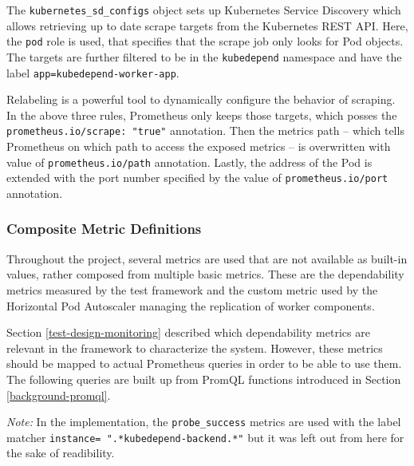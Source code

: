 The \texttt{kubernetes\_sd\_configs} object sets up Kubernetes Service Discovery which allows retrieving up to date scrape targets from the Kubernetes REST API. Here, the \texttt{pod} role is used, that specifies that the scrape job only looks for Pod objects. The targets are further filtered to be in the \texttt{kubedepend} namespace and have the label \texttt{app=kubedepend-worker-app}.

Relabeling is a powerful tool to dynamically configure the behavior of scraping. In the above three rules, Prometheus only keeps those targets, which posses the \texttt{prometheus.io/scrape: "true"} annotation. Then the metrics path -- which tells Prometheus on which path to access the exposed metrics -- is overwritten with value of \texttt{prometheus.io/path} annotation. Lastly, the address of the Pod is extended with the port number specified by the value of \texttt{prometheus.io/port} annotation.

\subsubsection{Composite Metric Definitions}

Throughout the project, several metrics are used that are not available as built-in values, rather composed from multiple basic metrics. These are the dependability metrics measured by the test framework and the custom metric used by the Horizontal Pod Autoscaler managing the replication of worker components.

 Section \ref{test-design-monitoring} described which dependability metrics are relevant in the framework to characterize the system. However, these metrics should be mapped to actual Prometheus queries in order to be able to use them. The following queries are built up from PromQL functions introduced in Section \ref{background-promql}.
 

\emph{Note:} In the implementation, the \texttt{probe\_success} metrics are used with the label matcher \texttt{instance=~".*kubedepend-backend.*"} but it was left out from here for the sake of readibility.

